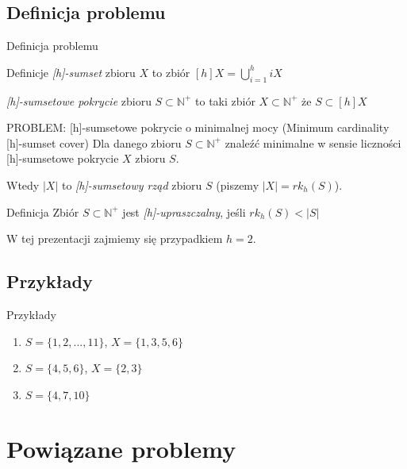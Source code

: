 \documentclass{beamer}
\newcommand{\N}{\mathbb{N}}
\begin{document}
	\subsection{Definicja problemu}
		\begin{frame}{Definicja problemu}
			\begin{block}{Definicje}
				\emph{[h]-sumset} zbioru $ X $ to zbiór $ [h]X = \bigcup_{i=1}^{h} iX $

				\emph{[h]-sumsetowe pokrycie} zbioru $ S \subset \N^{+} $ to taki zbiór $ X \subset \N^{+} $ że $ S \subset [h]X $
			\end{block}
			
			\pause
			\begin{alertblock}{PROBLEM: [h]-sumsetowe pokrycie o minimalnej mocy (Minimum cardinality [h]-sumset cover)}
				Dla danego zbioru $ S \subset \N^{+} $ znaleźć minimalne w sensie liczności [h]-sumsetowe pokrycie $ X $ zbioru $ S $.
				
				Wtedy $ |X| $ to \emph{[h]-sumsetowy rząd} zbioru $ S $ (piszemy $ |X| = rk_{h}(S) $).
			\end{alertblock}
			
			\pause
			\begin{block}{Definicja}
				Zbiór $ S \subset \N^{+} $ jest \emph{[h]-upraszczalny}, jeśli $ rk_{h}(S) < |S| $
			\end{block}
			
			\pause
			W tej prezentacji zajmiemy się przypadkiem $ h=2 $.
		\end{frame}
		
	\subsection{Przykłady}
		\begin{frame}{Przykłady}
			\begin{enumerate}
				\item $ S = \lbrace 1,2,...,11 \rbrace $, $ X = \lbrace 1,3,5,6 \rbrace $
				\pause \item $ S = \lbrace 4,5,6 \rbrace $, $ X = \lbrace 2,3 \rbrace $
				\pause \item $ S =  \lbrace 4,7,10 \rbrace $
			\end{enumerate}
								
		\end{frame}
		
\section{Powiązane problemy}
\end{document}
